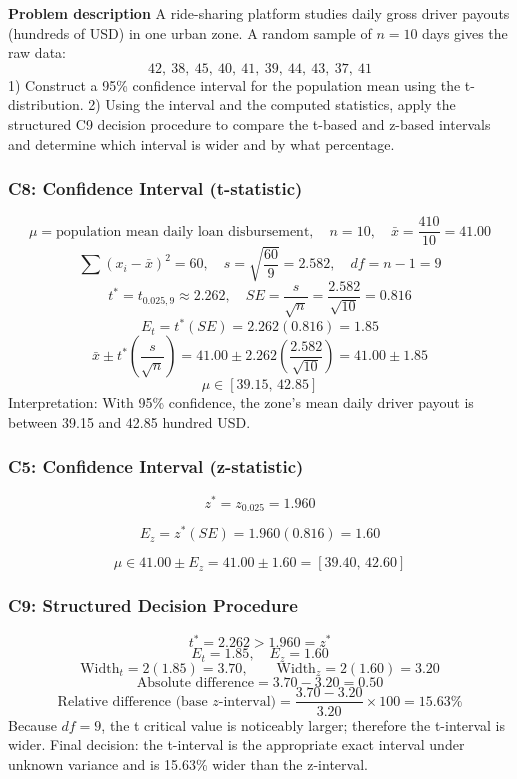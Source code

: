 	\begin{ExamProblems}
		\item
		\textbf{Problem description}
		A ride-sharing platform studies daily gross driver payouts (hundreds of USD) in one urban zone.
		A random sample of $n=10$ days gives the raw data:
		\[
		42,\ 38,\ 45,\ 40,\ 41,\ 39,\ 44,\ 43,\ 37,\ 41
		\]
		1) Construct a 95\% confidence interval for the population mean using the t-distribution.
		2) Using the interval and the computed statistics, apply the structured C9 decision procedure to compare the t-based and z-based intervals and determine which interval is wider and by what percentage.

		\subsubsection*{C8: Confidence Interval (t-statistic)}
		\[
		\mu=\text{population mean daily loan disbursement},\quad n=10,\quad \bar{x}=\frac{410}{10}=41.00
		\]
		\[
		\sum (x_i-\bar{x})^2=60,\quad s=\sqrt{\frac{60}{9}}=2.582,\quad df=n-1=9
		\]
		\[
		t^*=t_{0.025,9}\approx 2.262,\quad SE=\frac{s}{\sqrt{n}}=\frac{2.582}{\sqrt{10}}=0.816
		\]
		\[
		E_t=t^*(SE)=2.262(0.816)=1.85
		\]
		\[
		\bar{x}\pm t^*\left(\frac{s}{\sqrt{n}}\right)=41.00\pm 2.262\left(\frac{2.582}{\sqrt{10}}\right)=41.00\pm 1.85
		\]
		\[
		\mu\in[39.15,\,42.85]
		\]
		Interpretation: With 95\% confidence, the zone's mean daily driver payout is between 39.15 and 42.85 hundred USD.

		\subsubsection*{C5: Confidence Interval (z-statistic)}
		\[
		z^*=z_{0.025}=1.960
		\]

		\[
		E_z=z^*(SE)=1.960(0.816)=1.60
		\]

		\[
		\mu\in 41.00\pm E_z=41.00\pm 1.60=[39.40,\,42.60]
		\]

		\subsubsection*{C9: Structured Decision Procedure}
		\[
		t^*=2.262>1.960=z^*
		\]
		\[
		E_t=1.85,\quad E_z=1.60
		\]
		\[
		\text{Width}_t=2(1.85)=3.70,\qquad \text{Width}_z=2(1.60)=3.20
		\]
		\[
		\text{Absolute difference}=3.70-3.20=0.50
		\]
		\[
		\text{Relative difference (base }z\text{-interval)}=\frac{3.70-3.20}{3.20}\times 100=15.63\%
		\]
		Because $df=9$, the t critical value is noticeably larger; therefore the t-interval is wider.
		Final decision: the t-interval is the appropriate exact interval under unknown variance and is 15.63\% wider than the z-interval.


\end{ExamProblems}
